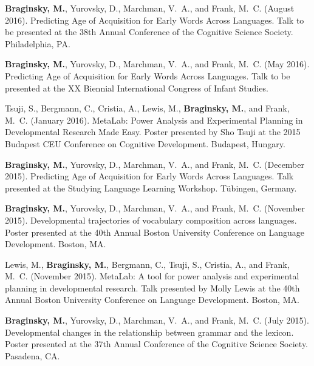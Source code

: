 \documentclass[11pt,letter]{moderncv}
\begin{document}
\begin{small}
\begin{thebibliography}{}

\textbf{Braginsky, M.}, Yurovsky, D., Marchman, V.~A., and Frank, M.~C. (August 2016).
\newblock Predicting Age of Acquisition for Early Words Across Languages.
\newblock Talk to be presented at the 38th Annual Conference of the Cognitive Science Society.
  Philadelphia, PA.

\textbf{Braginsky, M.}, Yurovsky, D., Marchman, V.~A., and Frank, M.~C. (May 2016).
\newblock Predicting Age of Acquisition for Early Words Across Languages.
\newblock Talk to be presented at the XX Biennial International Congress of Infant Studies.
  
Tsuji, S., Bergmann, C., Cristia, A., Lewis, M., \textbf{Braginsky, M.}, and Frank, M.~C. (January 2016).
\newblock MetaLab: Power Analysis and Experimental Planning in Developmental Research Made Easy.
\newblock Poster presented by Sho Tsuji at the 2015 Budapest CEU Conference on Cognitive Development.
  Budapest, Hungary.

\textbf{Braginsky, M.}, Yurovsky, D., Marchman, V.~A., and Frank, M.~C. (December 2015).
\newblock Predicting Age of Acquisition for Early Words Across Languages.
\newblock Talk presented at the Studying Language Learning Workshop.
  T{\"u}bingen, Germany.
  
\textbf{Braginsky, M.}, Yurovsky, D., Marchman, V.~A., and Frank, M.~C. (November 2015).
\newblock Developmental trajectories of vocabulary composition across languages.
\newblock Poster presented at the 40th Annual Boston University
  Conference on Language Development.
  Boston, MA.
  
Lewis, M., \textbf{Braginsky, M.}, Bergmann, C., Tsuji, S., Cristia, A., and Frank, M.~C. (November 2015).
\newblock MetaLab: A tool for power analysis and experimental planning in developmental research.
\newblock Talk presented by Molly Lewis at the 40th Annual Boston University
  Conference on Language Development.
  Boston, MA.
  
\textbf{Braginsky, M.}, Yurovsky, D., Marchman, V.~A., and Frank, M.~C. (July 2015).
\newblock Developmental changes in the relationship between grammar and the
  lexicon.
\newblock Poster presented at the 37th Annual Conference of the Cognitive Science Society.
  Pasadena, CA.


\end{thebibliography}
\end{small}
\end{document}
